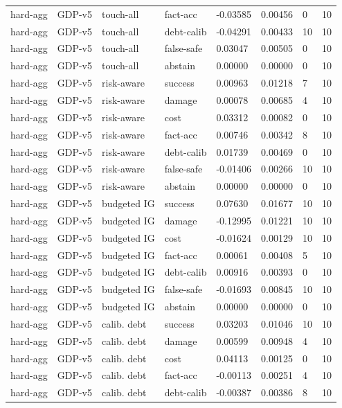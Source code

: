 \documentclass{article}
\begin{document}
\begin{center}
\begin{longtable}{llllllll}
hard-agg & GDP-v5 & touch-all & fact-acc & -0.03585 & 0.00456 & 0 & 10 \\
hard-agg & GDP-v5 & touch-all & debt-calib & -0.04291 & 0.00433 & 10 & 10 \\
hard-agg & GDP-v5 & touch-all & false-safe & 0.03047 & 0.00505 & 0 & 10 \\
hard-agg & GDP-v5 & touch-all & abstain & 0.00000 & 0.00000 & 0 & 10 \\
hard-agg & GDP-v5 & risk-aware & success & 0.00963 & 0.01218 & 7 & 10 \\
hard-agg & GDP-v5 & risk-aware & damage & 0.00078 & 0.00685 & 4 & 10 \\
hard-agg & GDP-v5 & risk-aware & cost & 0.03312 & 0.00082 & 0 & 10 \\
hard-agg & GDP-v5 & risk-aware & fact-acc & 0.00746 & 0.00342 & 8 & 10 \\
hard-agg & GDP-v5 & risk-aware & debt-calib & 0.01739 & 0.00469 & 0 & 10 \\
hard-agg & GDP-v5 & risk-aware & false-safe & -0.01406 & 0.00266 & 10 & 10 \\
hard-agg & GDP-v5 & risk-aware & abstain & 0.00000 & 0.00000 & 0 & 10 \\
hard-agg & GDP-v5 & budgeted IG & success & 0.07630 & 0.01677 & 10 & 10 \\
hard-agg & GDP-v5 & budgeted IG & damage & -0.12995 & 0.01221 & 10 & 10 \\
hard-agg & GDP-v5 & budgeted IG & cost & -0.01624 & 0.00129 & 10 & 10 \\
hard-agg & GDP-v5 & budgeted IG & fact-acc & 0.00061 & 0.00408 & 5 & 10 \\
hard-agg & GDP-v5 & budgeted IG & debt-calib & 0.00916 & 0.00393 & 0 & 10 \\
hard-agg & GDP-v5 & budgeted IG & false-safe & -0.01693 & 0.00845 & 10 & 10 \\
hard-agg & GDP-v5 & budgeted IG & abstain & 0.00000 & 0.00000 & 0 & 10 \\
hard-agg & GDP-v5 & calib. debt & success & 0.03203 & 0.01046 & 10 & 10 \\
hard-agg & GDP-v5 & calib. debt & damage & 0.00599 & 0.00948 & 4 & 10 \\
hard-agg & GDP-v5 & calib. debt & cost & 0.04113 & 0.00125 & 0 & 10 \\
hard-agg & GDP-v5 & calib. debt & fact-acc & -0.00113 & 0.00251 & 4 & 10 \\
hard-agg & GDP-v5 & calib. debt & debt-calib & -0.00387 & 0.00386 & 8 & 10 \\

\end{longtable}
\end{center}
\end{document}
